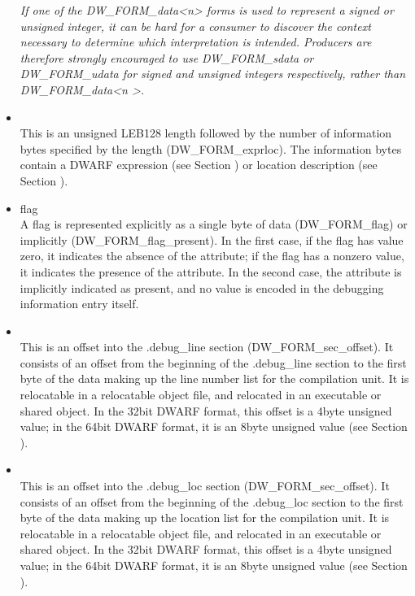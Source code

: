 \begin{itemize}
\textit{If one of the DW\_FORM\_data<n> forms is used to represent a
signed or unsigned integer, it can be hard for a consumer
to discover the context necessary to determine which
interpretation is intended. Producers are therefore strongly
encouraged to use DW\_FORM\_sdata or DW\_FORM\_udata for signed and
unsigned integers respectively, rather than 
DW\_FORM\_data\textless n \textgreater.}


\item {} \\
This is an unsigned LEB128 length followed by the
number of information bytes specified by the length
(DW\_FORM\_exprloc). The information bytes contain a DWARF
expression 
(see Section ) 
or location description 
(see Section ).

\item flag \\
A flag is represented explicitly as a single byte of data
(DW\_FORM\_flag) or implicitly (DW\_FORM\_flag\_present). In the
first case, if the flag has value zero, it indicates the
absence of the attribute; if the flag has a non\dash zero value,
it indicates the presence of the attribute. In the second
case, the attribute is implicitly indicated as present, and
no value is encoded in the debugging information entry itself.

\item {} \\
This is an offset into the .debug\_line section
(DW\_FORM\_sec\_offset). It consists of an offset from the
beginning of the .debug\_line section to the first byte of
the data making up the line number list for the compilation
unit. 
It is relocatable in a relocatable object file, and
relocated in an executable or shared object. In the 32\dash bit
DWARF format, this offset is a 4\dash byte unsigned value;
in the 64\dash bit DWARF format, it is an 8\dash byte unsigned value
(see Section ).


\item {} \\
This is an offset into the .debug\_loc section
(DW\_FORM\_sec\_offset). It consists of an offset from the
beginning of the .debug\_loc section to the first byte of
the data making up the location list for the compilation
unit. 
It is relocatable in a relocatable object file, and
relocated in an executable or shared object. In the 32\dash bit
DWARF format, this offset is a 4\dash byte unsigned value;
in the 64\dash bit DWARF format, it is an 8\dash byte unsigned value
(see Section ).



\end{itemize}
